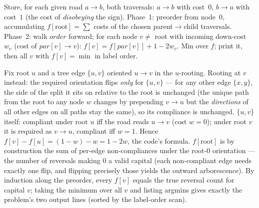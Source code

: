 Store, for each given road $a \to b$, both traversals: $a \to b$ with cost~$0$,
$b \to a$ with cost~$1$ (the cost of \emph{disobeying} the sign). Phase~1: preorder
from node~$0$, accumulating $f[\text{root}] = \sum$ costs of the chosen parent$\to$child
traversals. Phase~2: walk $\mathit{order}$ forward; for each node $v \ne$ root with
incoming down-cost $w_v$ (cost of $par[v] \to v$): $f[v] = f[par[v]] + 1 - 2 w_v$.
Min over $f$; print it, then all $v$ with $f[v] = \min$ in label order.

\begin{proofbox}
Fix root $u$ and a tree edge $\{u,v\}$ oriented $u \to v$ in the $u$-rooting. Rooting at
$v$ instead: the required orientation flips \emph{only} for $\{u,v\}$ --- for any other
edge $\{x,y\}$, the side of the split it sits on relative to the root is unchanged
(the unique path from the root to any node $w$ changes by prepending $v \to u$ but the
\emph{directions} of all other edges on all paths stay the same), so its compliance is
unchanged. $\{u,v\}$ itself: compliant under root $u$ iff the road reads $u \to v$
(cost $w=0$); under root $v$ it is required as $v \to u$, compliant iff $w = 1$.
Hence $f[v] - f[u] = (1-w) - w = 1 - 2w$, the code's formula. $f[\text{root}]$ is by
construction the sum of per-edge non-compliances under the root-0 orientation --- the
number of reversals making $0$ a valid capital (each non-compliant edge needs exactly
one flip, and flipping precisely those yields the outward arborescence). By induction
along the preorder, every $f[v]$ equals the true reversal count for capital $v$; taking
the minimum over all $v$ and listing argmins gives exactly the problem's two output
lines (sorted by the label-order scan).
\end{proofbox}

